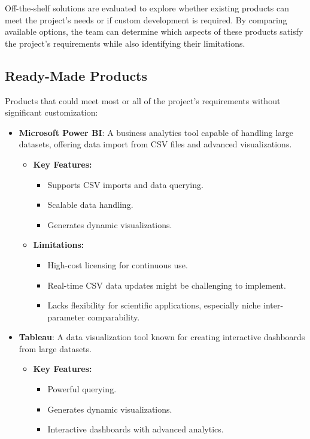 \documentclass[12pt]{article}
\begin{document}
Off-the-shelf solutions are evaluated to explore whether existing products can
meet the project’s needs or if custom development is required. By comparing
available options, the team can determine which aspects of these products
satisfy the project's requirements while also identifying their limitations.

\subsection{Ready-Made Products}

Products that could meet most or all of the project’s requirements without
significant customization:

\begin{itemize}
    \item \textbf{Microsoft Power BI}: A business analytics tool capable of
    handling large datasets, offering data import from CSV files and advanced
    visualizations.
    
    \begin{itemize}
        \item \textbf{Key Features:}
        \begin{itemize}
            \item Supports CSV imports and data querying.
            \item Scalable data handling.
            \item Generates dynamic visualizations.
        \end{itemize}

        \item \textbf{Limitations:}
        \begin{itemize}
            \item High-cost licensing for continuous use.
            \item Real-time CSV data updates might be challenging to implement.
            \item Lacks flexibility for scientific applications, especially
            niche inter-parameter comparability.
        \end{itemize}
    \end{itemize}

    \item \textbf{Tableau}: A data visualization tool known for creating
    interactive dashboards from large datasets.
    
    \begin{itemize}
        \item \textbf{Key Features:}
        \begin{itemize}
            \item Powerful querying.
            \item Generates dynamic visualizations.
            \item Interactive dashboards with advanced analytics.
        \end{itemize}


\end{itemize}
\end{itemize}
\end{document}
